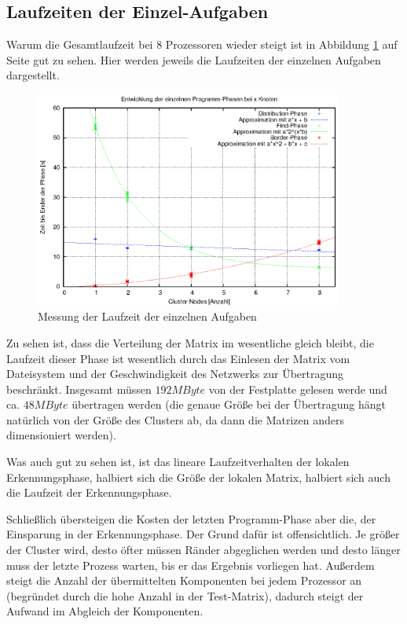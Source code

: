 \subsection{Laufzeiten der Einzel-Aufgaben} \label{bench:task}

Warum die Gesamtlaufzeit bei 8 Prozessoren wieder steigt ist in Abbildung \ref{fig:bench_tasks} auf Seite \pageref{fig:bench_tasks} gut zu sehen. Hier werden jeweils die Laufzeiten der einzelnen Aufgaben dargestellt.

\begin{figure}[tbhp]
	\centering
	\includegraphics[width=0.9\textwidth]{images/phases.eps}
	\caption{Messung der Laufzeit der einzelnen Aufgaben}
	\label{fig:bench_tasks}
\end{figure}

Zu sehen ist, dass die Verteilung der Matrix im wesentliche gleich bleibt, die Laufzeit dieser Phase ist wesentlich durch das Einlesen der Matrix vom Dateisystem und der Geschwindigkeit des Netzwerks zur Übertragung beschränkt. Insgesamt müssen $192MByte$ von der Festplatte gelesen werde und ca. $48MByte$ übertragen werden (die genaue Größe bei der Übertragung hängt natürlich von der Größe des Clusters ab, da dann die Matrizen anders dimensioniert werden).

Was auch gut zu sehen ist, ist das lineare Laufzeitverhalten der lokalen Erkennungsphase, halbiert sich die Größe der lokalen Matrix, halbiert sich auch die Laufzeit der Erkennungsphase.

Schließlich übersteigen die Kosten der letzten Programm-Phase aber die, der Einsparung in der Erkennungsphase. Der Grund dafür ist offensichtlich. Je größer der Cluster wird, desto öfter müssen Ränder abgeglichen werden und desto länger muss der letzte Prozess warten, bis er das Ergebnis vorliegen hat. Außerdem steigt die Anzahl der übermittelten Komponenten bei jedem Prozessor an (begründet durch die hohe Anzahl in der Test-Matrix), dadurch steigt der Aufwand im Abgleich der Komponenten.